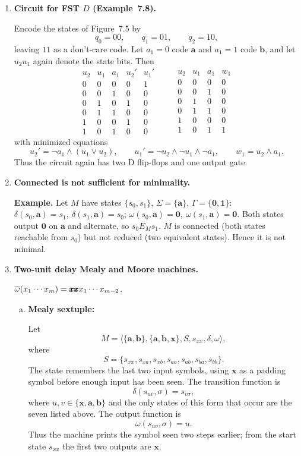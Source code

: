 \begin{enumerate}[{7.}1.]
\item \textbf{Circuit for FST $D$ (Example~7.8).}

Encode the states of Figure~7.5 by
\[
  q_0=00,\qquad q_1=01,\qquad q_2=10,
\]
leaving $11$ as a don't-care code.  Let $a_1=0$ code $\pmb{a}$ and $a_1=1$ code
$\pmb{b}$, and let $u_2u_1$ again denote the state bits.  Then
\[
\begin{array}{ccc|cc}
u_2&u_1&a_1&u_2'&u_1'\\
\hline
0&0&0&0&1\\
0&0&1&0&0\\
0&1&0&1&0\\
0&1&1&0&0\\
1&0&0&1&0\\
1&0&1&0&0
\end{array}
\qquad
\begin{array}{ccc|c}
u_2&u_1&a_1&w_1\\
\hline
0&0&0&0\\
0&0&1&0\\
0&1&0&0\\
0&1&1&0\\
1&0&0&0\\
1&0&1&1
\end{array}
\]
with minimized equations
\[
  u_2'=\neg a_1\wedge (u_1\vee u_2),\qquad
  u_1'=\neg u_2\wedge \neg u_1\wedge \neg a_1,\qquad
  w_1=u_2\wedge a_1.
\]
Thus the circuit again has two D flip-flops and one output gate.

\item \textbf{Connected is not sufficient for minimality.}

\textbf{Example.}  Let $M$ have states $\{s_0,s_1\}$, $\Sigma=\{\pmb{a}\}$, $\Gamma=\{\pmb{0},\pmb{1}\}$:
$\delta(s_0,\pmb{a})=s_1,\ \delta(s_1,\pmb{a})=s_0$; $\omega(s_0,\pmb{a})=\pmb{0},\ \omega(s_1,\pmb{a})=\pmb{0}$.
Both states output $\pmb{0}$ on $\pmb{a}$ and alternate, so $s_0 E_M s_1$.  $M$ is connected (both states reachable from $s_0$) but not reduced (two equivalent states).  Hence it is not minimal.

\item \textbf{Two-unit delay Mealy and Moore machines.}

$\overline{\omega}(x_1\cdots x_m)=\pmb{xx}x_1\cdots x_{m-2}$.

\begin{enumerate}[(a)]
  \item \textbf{Mealy sextuple:}

  Let
  \[
    M=\langle\{\pmb{a},\pmb{b}\},\{\pmb{a},\pmb{b},\pmb{x}\},S,s_{xx},\delta,\omega\rangle,
  \]
  where
  \[
    S=\{s_{xx},s_{xa},s_{xb},s_{aa},s_{ab},s_{ba},s_{bb}\}.
  \]
  The state remembers the last two input symbols, using $\pmb{x}$ as a padding
  symbol before enough input has been seen.  The transition function is
  \[
    \delta(s_{uv},\sigma)=s_{v\sigma},
  \]
  where $u,v\in\{\pmb{x},\pmb{a},\pmb{b}\}$ and the only states of this form that
  occur are the seven listed above.  The output function is
  \[
    \omega(s_{uv},\sigma)=u.
  \]
  Thus the machine prints the symbol seen two steps earlier; from the start
  state $s_{xx}$ the first two outputs are $\pmb{x}$.


\end{enumerate}
\end{enumerate}
